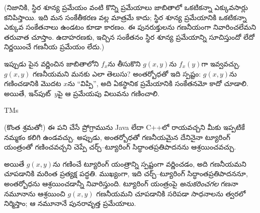 \documentclass[../../../include/open-logic-section]{subfiles}
\begin{document}
(నిజానికి, స్థిర శూన్య ప్రమేయం వంటి కొన్ని ప్రమేయాలు జాబితాలో
ఒకటికన్నా ఎక్కువసార్లు కనిపిస్తాయి. ఇది మన సంకేతీకరణ వల్ల మాత్రమే
కాదు; స్థిర శూన్య ప్రమేయానికి ఒకటికన్నా ఎక్కువ సంకేతనాలు ఉండటం కూడా
కారణం. ఈ పునరుక్తులను గణనీయంగా నివారించలేమని తరువాత చూస్తాం. ఉదాహరణకు,
ఇచ్చిన సంకేతనం స్థిర శూన్య ప్రమేయాన్ని సూచిస్తుందో లేదో నిర్ణయించే
గణనీయ ప్రమేయం లేదు.)

ఇప్పుడు పైన వర్ణించిన జాబితాలోని $f_x$ను తీసుకొని $g(x,y)$ను $f_x(y)$గా
ఇవ్వవచ్చు. $g(x,y)$ గణనీయమని మనకు ఎలా తెలుసు? అంతర్బోధతో ఇది
స్పష్టం: $g(x,y)$ను గణించడానికి మొదట $x$ను ``విప్పి'', అది ఏకస్థానిక
ప్రమేయానికి సంకేతనమో కాదో చూడాలి. అయితే, ఇన్‌పుట్~$y$పై ఆ ప్రమేయపు
విలువను గణించాలి.

\begin{tagblock}{TMs}
\begin{digress}
(కొంత శ్రమతో!) ఈ పని చేసే ప్రోగ్రామును Java లేదా C++లో రాయవచ్చని
మీకు ఇప్పటికే నమ్మకం కలిగి ఉండవచ్చు. అప్పుడు, అంతర్బోధతో గణనీయమైన
దేనినైనా ట్యూరింగ్ యంత్రంతో గణించవచ్చని చెప్పే చర్చ్--ట్యూరింగ్
సిద్ధాంతప్రతిపాదనను ఆశ్రయించవచ్చు.

అయితే $g(x,y)$ను గణించే ట్యూరింగ్ యంత్రాన్ని స్పష్టంగా వర్ణించడం,
అది గణనీయమని చూపడానికి మరింత ప్రత్యక్ష పద్ధతి. ముఖ్యంగా, ఇది
చర్చ్--ట్యూరింగ్ సిద్ధాంతప్రతిపాదననూ, అంతర్బోధను ఆశ్రయించడాన్నీ
నివారిస్తుంది. ట్యూరింగ్ యంత్రంపై \emph{అనుకరించగల} గణనా నమూనాను
ఆశ్రయించి $g(x,y)$ గణనీయమని చూపడానికి సరిపడా సాధనాలను త్వరలో
నిర్మిస్తాం; ఆ నమూనానే పునరావృత్త ప్రమేయాలు.
\end{digress}
\end{tagblock}
\end{document}
